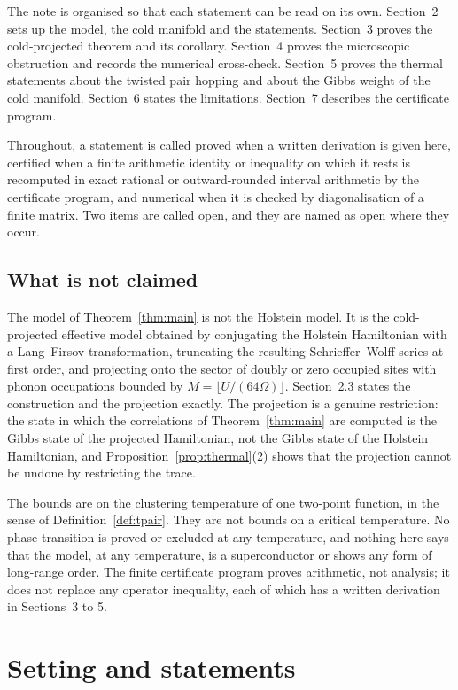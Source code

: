\documentclass[11pt]{article}
\theoremstyle{plain}
\theoremstyle{definition}
\begin{document}
The note is organised so that each statement can be read on its own. Section~2
sets up the model, the cold manifold and the statements.
Section~3 proves the cold-projected theorem and its corollary.
Section~4 proves the microscopic obstruction and records the numerical
cross-check. Section~5 proves the thermal statements about the twisted pair
hopping and about the Gibbs weight of the cold manifold. Section~6 states the
limitations. Section~7 describes the certificate program.

Throughout, a statement is called proved when a written derivation is given
here, certified when a finite arithmetic identity or inequality on which it rests
is recomputed in exact rational or outward-rounded interval arithmetic by the
certificate program, and numerical when it is checked by diagonalisation of a
finite matrix. Two items are called open, and they are named as open where they
occur.

\subsection{What is not claimed}

The model of Theorem~\ref{thm:main} is not the Holstein model. It is the
cold-projected effective model obtained by conjugating the Holstein Hamiltonian
with a Lang--Firsov transformation, truncating the resulting Schrieffer--Wolff
series at first order, and projecting onto the sector of doubly or zero occupied
sites with phonon occupations bounded by $M=\lfloor U/(64\Omega)\rfloor$.
Section~2.3 states the construction and the projection exactly. The projection is
a genuine restriction: the state in which the correlations of
Theorem~\ref{thm:main} are computed is the Gibbs state of the projected
Hamiltonian, not the Gibbs state of the Holstein Hamiltonian, and
Proposition~\ref{prop:thermal}(2) shows that the projection cannot be undone by
restricting the trace.

The bounds are on the clustering temperature of one two-point function, in the
sense of Definition~\ref{def:tpair}. They are not bounds on a critical
temperature. No phase transition is proved or excluded at any temperature, and
nothing here says that the model, at any temperature, is a superconductor or
shows any form of long-range order. The finite certificate program proves
arithmetic, not analysis; it does not replace any operator inequality, each of
which has a written derivation in Sections~3 to 5.

\section{Setting and statements}\label{sec:model}
\end{document}
